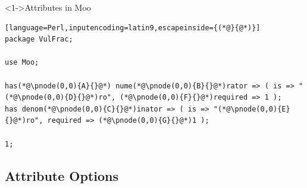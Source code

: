 \documentclass[ngerman,xcolor={table,dvipsnames},smaller,compress,hyperref={bookmarks,colorlinks}]{beamer}
\begin{document}
\begin{frame}[t,fragile]

\begin{block}<1->{Attributes in Moo}
\begin{lstlisting}[language=Perl,inputencoding=latin9,escapeinside={(*@}{@*)}]
package VulFrac;

use Moo;

has(*@\pnode(0,0){A}{}@*) nume(*@\pnode(0,0){B}{}@*)rator => ( is => "(*@\pnode(0,0){D}{}@*)ro", (*@\pnode(0,0){F}{}@*)required => 1 );
has denom(*@\pnode(0,0){C}{}@*)inator => ( is => "(*@\pnode(0,0){E}{}@*)ro", required => (*@\pnode(0,0){G}{}@*)1 );

1;
\end{lstlisting}
\end{block}

\begin{itemize}
\end{itemize}

\end{frame}

\subsection{Attribute Options}
\end{document}
